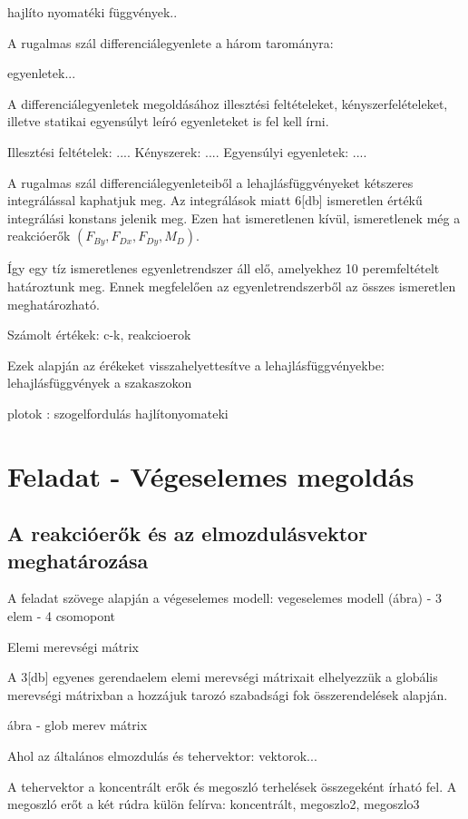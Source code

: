 \documentclass{article}
\begin{document}
		hajlíto nyomatéki függvények..
		
		A rugalmas szál differenciálegyenlete a három tarományra:
		
		egyenletek...
		
		A differenciálegyenletek megoldásához illesztési feltételeket, kényszerfelételeket, illetve statikai egyensúlyt leíró egyenleteket is fel kell írni.
		
		Illesztési feltételek:
		....
		Kényszerek: 
		....
		Egyensúlyi egyenletek:
		....
		
		A rugalmas szál differenciálegyenleteiből a lehajlásfüggvényeket kétszeres integrálással kaphatjuk meg. Az integrálások miatt 6[db] ismeretlen értékű integrálási konstans jelenik meg. Ezen hat ismeretlenen kívül, ismeretlenek még a reakcióerők $(F_{By}, F_{Dx}, F_{Dy}, M_{D})$.
		
		Így egy tíz ismeretlenes egyenletrendszer áll elő, amelyekhez 10 peremfeltételt határoztunk meg. Ennek megfelelően az egyenletrendszerből az összes ismeretlen meghatározható.
		
		Számolt értékek:
		c-k, reakcioerok
		
		Ezek alapján az érékeket visszahelyettesítve a lehajlásfüggvényekbe:
		lehajlásfüggvények a szakaszokon
		
		plotok :
		szogelfordulás
		hajlítonyomateki
	
	
	\section{Feladat - Végeselemes megoldás}
	\subsection{A reakcióerők és az elmozdulásvektor meghatározása}
		A feladat szövege alapján a végeselemes modell:
		vegeselemes modell (ábra) - 3 elem - 4 csomopont
		
		Elemi merevségi mátrix
		
		A 3[db] egyenes gerendaelem elemi merevségi mátrixait elhelyezzük a globális merevségi mátrixban a hozzájuk tarozó szabadsági fok összerendelések alapján.
		
		ábra - glob merev mátrix
		
		Ahol az általános elmozdulás és tehervektor:
		vektorok...
		
		A tehervektor a koncentrált erők és megoszló terhelések összegeként írható fel. A megoszló erőt a két rúdra külön felírva:
		koncentrált, megoszlo2, megoszlo3
		
\end{document}
